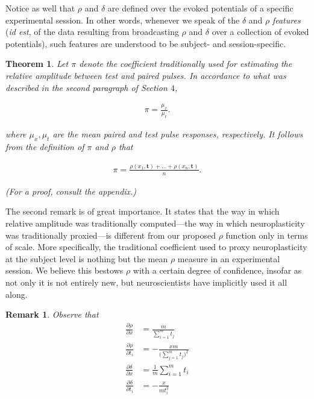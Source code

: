 \documentclass{article}
\newtheorem{remark}{Remark}
\newtheorem{theorem}{Theorem}
\begin{document}
\begin{multicols}{2}
Notice as well that $\rho$ and $\delta$ are defined over the evoked potentials
of a specific experimental session. In other words, whenever we speak of the
$\delta$ and $\rho$ \textit{features} (\textit{id est}, of the data resulting
from broadcasting $\rho$ and $\delta$ over a collection of evoked potentials),
such features are understood to be subject- and session-specific.


\begin{theorem}
    Let $\pi$ denote the coefficient traditionally used for estimating the
    relative amplitude between test and paired pulses. In accordance to what was
    described in the second paragraph of Section $4$,

    \begin{align*}
        \pi = \frac{\mu_x}{\mu_t}
    .\end{align*}

    where $\mu_x, \mu_t$ are the mean paired and test pulse responses,
    respectively. It follows from the definition of $\pi$ and $\rho$ that

    \begin{align*}
        \pi = \frac{\rho(x_1, \textbf{t}) + \ldots + \rho(x_n, \textbf{t})}{n}
    .\end{align*}

    (For a proof, consult the appendix.)
\end{theorem}

The second remark is of great importance. It states that the way in which
relative amplitude was traditionally computed---the way in which neuroplasticity
was traditionally proxied---is different from our proposed $\rho$ function only
in terms of scale. More specifically, the traditional coefficient used to proxy
neuroplasticity at the subject level is nothing but the mean $\rho$
measure in an experimental session. We believe this bestows $\rho$ with a
certain degree of confidence, insofar as not only it is not entirely new, but
neuroscientists have implicitly used it all along.

\begin{remark}
    Observe that 
    \begin{align*}
        \frac{\partial \rho}{\partial x } &= \frac{m}{\sum_{i = 1}^m
        t_j} \\ \frac{\partial \rho}{\partial t_i} &= -\frac{xm}{\big( \sum_{j =
        1}^m t_j \big)^2} \\ 
                    \frac{\partial \delta}{\partial x} &= \frac{1}{m}\sum_{i =
                    1}^m t_i \\ 
                        \frac{\partial \delta}{\partial t_i} &= -\frac{x}{mt_i^2}
    \end{align*}
\end{remark}


\end{multicols}
\end{document}
